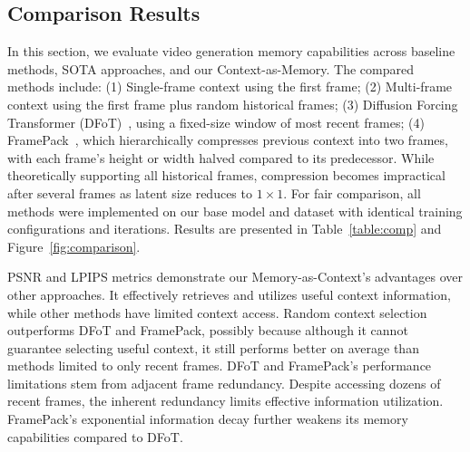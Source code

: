 \subsection{Comparison Results}
In this section, we evaluate video generation memory capabilities across baseline methods, SOTA approaches, and our Context-as-Memory. The compared methods include:
(1) Single-frame context using the first frame;
(2) Multi-frame context using the first frame plus random historical frames;
(3) Diffusion Forcing Transformer (DFoT)~\cite{dfot}, using a fixed-size window of most recent frames;
(4) FramePack~\cite{framepack}, which hierarchically compresses previous context into two frames, with each frame's height or width halved compared to its predecessor. While theoretically supporting all historical frames, compression becomes impractical after several frames as latent size reduces to $1\times 1$.
For fair comparison, all methods were implemented on our base model and dataset with identical training configurations and iterations.
Results are presented in Table~\ref{table:comp} and Figure~\ref{fig:comparison}.


PSNR and LPIPS metrics demonstrate our Memory-as-Context's advantages over other approaches. It effectively retrieves and utilizes useful context information, while other methods have limited context access. Random context selection outperforms DFoT and FramePack, possibly because although it cannot guarantee selecting useful context, it still performs better on average than methods limited to only recent frames.
DFoT and FramePack's performance limitations stem from adjacent frame redundancy. Despite accessing dozens of recent frames, the inherent redundancy limits effective information utilization. FramePack's exponential information decay further weakens its memory capabilities compared to DFoT.

